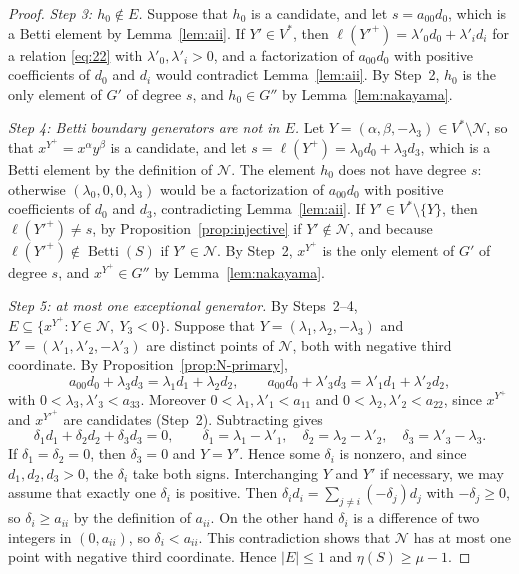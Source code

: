 \documentclass{amsart}
\theoremstyle{definition}
\theoremstyle{remark}
\numberwithin{equation}{section}
\DeclareMathOperator{\Betti}{Betti}
\newcommand{\wt}{\ell}
\begin{document}
\begin{proof}
\emph{Step 3: $h_0\notin E$.} Suppose that $h_0$ is a candidate, and let $s=a_{00}d_0$, which is a Betti element by Lemma~\ref{lem:aii}. If $Y'\in V^*$, then $\wt(Y'^+)=\lambda'_0d_0+\lambda'_id_i$ for a relation \eqref{eq:22} with $\lambda'_0,\lambda'_i>0$, and a factorization of $a_{00}d_0$ with positive coefficients of $d_0$ and $d_i$ would contradict Lemma~\ref{lem:aii}. By Step~2, $h_0$ is the only element of $G'$ of degree $s$, and $h_0\in G''$ by Lemma~\ref{lem:nakayama}.

\emph{Step 4: Betti boundary generators are not in $E$.} Let $Y=(\alpha,\beta,-\lambda_3)\in V^*\setminus\mathcal N$, so that $x^{Y^+}=x^\alpha y^\beta$ is a candidate, and let $s=\wt(Y^+)=\lambda_0d_0+\lambda_3d_3$, which is a Betti element by the definition of $\mathcal N$. The element $h_0$ does not have degree $s$: otherwise $(\lambda_0,0,0,\lambda_3)$ would be a factorization of $a_{00}d_0$ with positive coefficients of $d_0$ and $d_3$, contradicting Lemma~\ref{lem:aii}. If $Y'\in V^*\setminus\{Y\}$, then $\wt(Y'^+)\neq s$, by Proposition~\ref{prop:injective} if $Y'\notin\mathcal N$, and because $\wt(Y'^+)\notin\Betti(S)$ if $Y'\in\mathcal N$. By Step~2, $x^{Y^+}$ is the only element of $G'$ of degree $s$, and $x^{Y^+}\in G''$ by Lemma~\ref{lem:nakayama}.

\emph{Step 5: at most one exceptional generator.} By Steps~2--4, $E\subseteq\{x^{Y^+} : Y\in\mathcal N,\ Y_3<0\}$. Suppose that $Y=(\lambda_1,\lambda_2,-\lambda_3)$ and $Y'=(\lambda'_1,\lambda'_2,-\lambda'_3)$ are distinct points of $\mathcal N$, both with negative third coordinate. By Proposition~\ref{prop:N-primary},
\[
a_{00}d_0+\lambda_3d_3=\lambda_1d_1+\lambda_2d_2,\qquad a_{00}d_0+\lambda'_3d_3=\lambda'_1d_1+\lambda'_2d_2,
\]
with $0<\lambda_3,\lambda'_3<a_{33}$. Moreover $0<\lambda_1,\lambda'_1<a_{11}$ and $0<\lambda_2,\lambda'_2<a_{22}$, since $x^{Y^+}$ and $x^{Y'^+}$ are candidates (Step~2). Subtracting gives
\[
\delta_1d_1+\delta_2d_2+\delta_3d_3=0,\qquad \delta_1=\lambda_1-\lambda'_1,\quad\delta_2=\lambda_2-\lambda'_2,\quad\delta_3=\lambda'_3-\lambda_3 .
\]
If $\delta_1=\delta_2=0$, then $\delta_3=0$ and $Y=Y'$. Hence some $\delta_i$ is nonzero, and since $d_1,d_2,d_3>0$, the $\delta_i$ take both signs. Interchanging $Y$ and $Y'$ if necessary, we may assume that exactly one $\delta_i$ is positive. Then $\delta_id_i=\sum_{j\neq i}(-\delta_j)d_j$ with $-\delta_j\ge0$, so $\delta_i\ge a_{ii}$ by the definition of $a_{ii}$. On the other hand $\delta_i$ is a difference of two integers in $(0,a_{ii})$, so $\delta_i<a_{ii}$. This contradiction shows that $\mathcal N$ has at most one point with negative third coordinate. Hence $|E|\le1$ and $\eta(S)\ge\mu-1$.
\end{proof}
\end{document}
